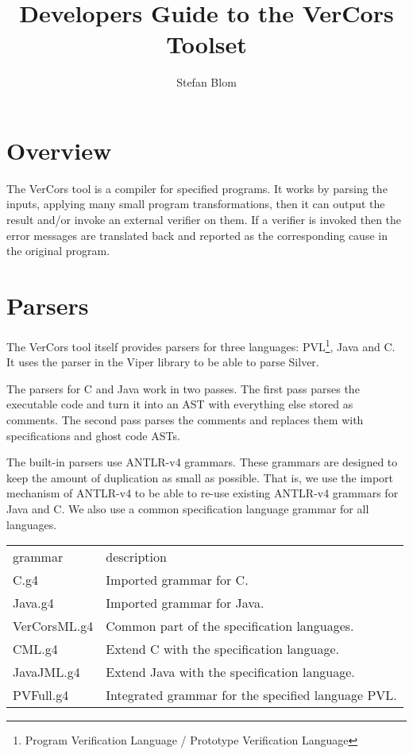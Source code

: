 \documentclass{report}
\author{Stefan Blom}
\title{Developers Guide to the VerCors Toolset}
\begin{document}
\maketitle

\tableofcontents

\chapter{Overview}

The VerCors tool is a compiler for specified programs. It works by 
parsing the inputs, applying many small program transformations,
then it can output the result and/or invoke an external verifier on them.
If a verifier is invoked then the error messages are translated back
and reported as the corresponding cause in the original program.



\chapter{Parsers}

The VerCors tool itself provides parsers for three languages:
PVL\footnote{Program Verification Language / Prototype Verification Language}, Java and C.
It uses the parser in the Viper library to be able to parse Silver.

The parsers for C and Java work in two passes. The first pass parses the executable code
and turn it into an AST with everything else stored as comments. The second pass
parses the comments and replaces them with specifications and ghost code ASTs.

The built-in parsers use ANTLR-v4 grammars. These grammars are designed
to keep the amount of duplication as small as possible. That is, we use
the import mechanism of ANTLR-v4 to be able to re-use
existing ANTLR-v4 grammars for Java and C. We also use a common specification
language grammar for all languages.

\par\noindent\begin{tabularx}{\textwidth}{lX}
grammar & description
\\
C.g4 & Imported grammar for C.
\\
Java.g4 & Imported grammar for Java.
\\
VerCorsML.g4 & Common part of the specification languages.
\\
CML.g4 & Extend C with the specification language.
\\
JavaJML.g4 & Extend Java with the specification language.
\\
PVFull.g4 & Integrated grammar for the specified language PVL.
\end{tabularx}
\end{document}
